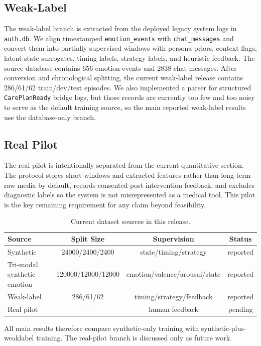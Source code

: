 \subsection{Weak-Label}
The weak-label branch is extracted from the deployed legacy system logs in \texttt{auth.db}. We align timestamped \texttt{emotion\_events} with \texttt{chat\_messages} and convert them into partially supervised windows with persona priors, context flags, latent state surrogates, timing labels, strategy labels, and heuristic feedback. The source database contains 656 emotion events and 2838 chat messages. After conversion and chronological splitting, the current weak-label release contains 286/61/62 train/dev/test episodes. We also implemented a parser for structured \texttt{CarePlanReady} bridge logs, but those records are currently too few and too noisy to serve as the default training source, so the main reported weak-label results use the database-only branch.

\subsection{Real Pilot}
The real pilot is intentionally separated from the current quantitative section. The protocol stores short windows and extracted features rather than long-term raw media by default, records consented post-intervention feedback, and excludes diagnostic labels so the system is not misrepresented as a medical tool. This pilot is the key remaining requirement for any claim beyond feasibility.

\begin{table}[t]
\centering
\caption{Current dataset sources in this release.}
\label{tab:data-sources}
\begin{tabular}{lccc}
\toprule
Source & Split Size & Supervision & Status \\
\midrule
Synthetic & 24000/2400/2400 & state/timing/strategy & reported \\
Tri-modal synthetic emotion & 120000/12000/12000 & emotion/valence/arousal/state & reported \\
Weak-label & 286/61/62 & timing/strategy/feedback & reported \\
Real pilot & -- & human feedback & pending \\
\bottomrule
\end{tabular}
\end{table}

All main results therefore compare synthetic-only training with synthetic-plus-weaklabel training. The real-pilot branch is discussed only as future work.
